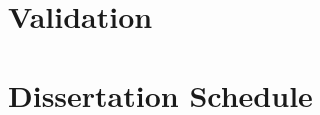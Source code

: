 \documentclass[phd]{byuprop}
\begin{document}
\section{Validation}

\section{Dissertation Schedule}




\end{document}
